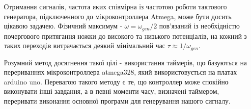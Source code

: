 
Отримання сигналів, частота яких співмірна із частотою роботи тактового генератора, підключенного до мікроконтроллера Atmega, може бути досить цікавою задачею. Фізичний максимум - $\omega = \omega_{gen}/2$ пов'язаний із необхідністю почергового притягання ножки до високого та низького потенціалів, на кожний з таких переходів витрачається деякий мінімальний час $\tau \approx 1/\omega_{gen}$. 

Розумний метод досягнення такої цілі - використання таймерів, що базуються на перериваннях мікроконтроллера atmega328, який використовується на платах arduino uno. Перевагою такого методу є те, що контроллер може спокійно виконувати інші завдання, а в певні моменти часу, визначені таймером, переривати виконання основної програми для генерування нашого сигналу.